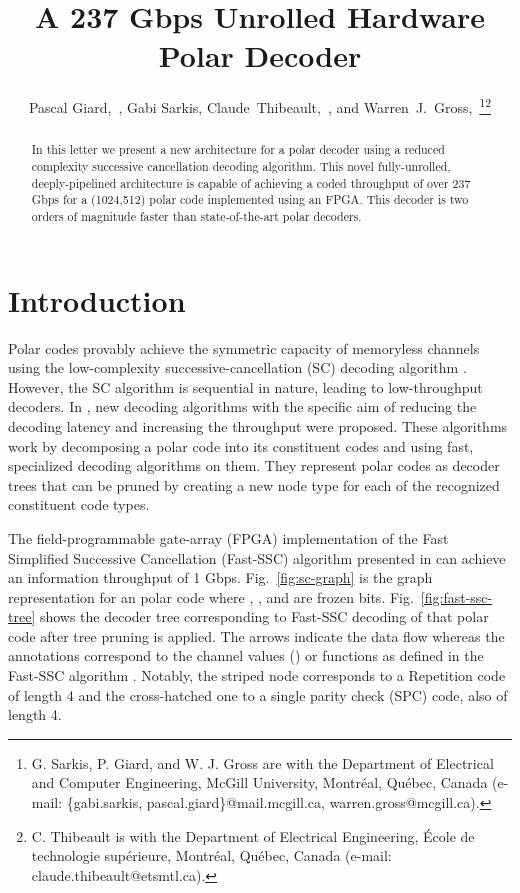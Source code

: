 \documentclass[letterpaper,onecolumn,journal,12pt]{IEEEtran}
\begin{document}
\title{A 237 Gbps Unrolled Hardware Polar Decoder}

\author{Pascal Giard,~, Gabi Sarkis, Claude~Thibeault,~, and Warren~J.~Gross,~\thanks{G. Sarkis, P. Giard, and W. J. Gross are with the Department of Electrical and Computer Engineering, McGill University, Montr\'eal, Qu\'ebec, Canada (e-mail: \{gabi.sarkis, pascal.giard\}@mail.mcgill.ca, warren.gross@mcgill.ca).}\thanks{C. Thibeault is with the Department of Electrical Engineering, \'Ecole de technologie sup\'erieure, Montr\'eal, Qu\'ebec, Canada (e-mail: claude.thibeault@etsmtl.ca).}}

\maketitle

\begin{abstract}
In this letter we present a new architecture for a polar decoder using a reduced complexity successive cancellation decoding algorithm. This novel fully-unrolled, deeply-pipelined architecture is capable of achieving a coded throughput of over 237 Gbps for a (1024,512) polar code implemented using an FPGA. This decoder is two orders of magnitude faster than state-of-the-art polar decoders.
\end{abstract}

\section{Introduction}
Polar codes provably achieve the symmetric capacity of memoryless channels using the low-complexity successive-cancellation (SC) decoding algorithm \cite{Arikan2009}. However, the SC algorithm is sequential in nature, leading to low-throughput decoders. In \cite{Alamdar-Yazdi2011,Sarkis2014}, new decoding algorithms with the specific aim of reducing the decoding latency and increasing the throughput were proposed.
These algorithms work by decomposing a polar code into its constituent codes and using fast, specialized decoding algorithms on them. They represent polar codes as decoder trees that can be pruned by creating a new node type for each of the recognized constituent code types.

The field-programmable gate-array (FPGA) implementation of the Fast Simplified Successive Cancellation (Fast-SSC) algorithm presented in \cite{Sarkis2014} can achieve an information throughput of 1 Gbps. Fig.~\ref{fig:sc-graph} is the graph representation for an  polar code where , ,  and  are frozen bits. Fig.~\ref{fig:fast-ssc-tree} shows the decoder tree corresponding to Fast-SSC decoding of that  polar code after tree pruning is applied. The arrows indicate the data flow whereas the annotations correspond to the channel values () or functions as defined in the Fast-SSC algorithm \cite{Sarkis2014}. Notably, the striped node corresponds to a Repetition code of length 4 and the cross-hatched one to a single parity check (SPC) code, also of length 4.
\end{document}
